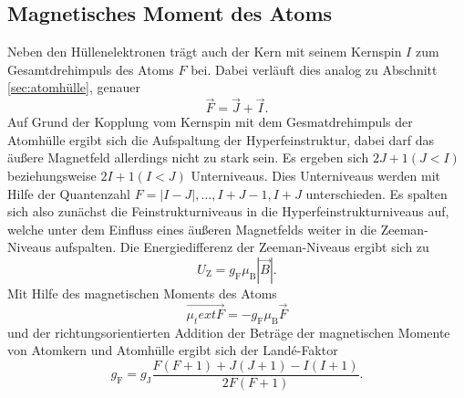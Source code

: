 \subsection{Magnetisches Moment des Atoms}
\label{sec:atom}
Neben den Hüllenelektronen trägt auch der Kern mit seinem Kernspin $I$ zum Gesamtdrehimpuls des Atoms $F$ bei.
Dabei verläuft dies analog zu Abschnitt \ref{sec:atomhülle}, genauer
\begin{equation*}
  \vec{F} = \vec{J} + \vec{I}.
\end{equation*}
Auf Grund der Kopplung vom Kernspin mit dem Gesmatdrehimpuls der Atomhülle ergibt sich die Aufspaltung der 
Hyperfeinstruktur, dabei darf das äußere Magnetfeld allerdings nicht zu stark sein.
Es ergeben sich $2J+1 (J<I)$ beziehungsweise $2I+1 (I<J)$  Unterniveaus. Dies Unterniveaus werden mit Hilfe
der Quantenzahl $F = |I-J|, \ldots,I+J-1, I+J$ unterschieden. Es spalten sich also zunächst die Feinstrukturniveaus
in die Hyperfeinstrukturniveaus auf, welche unter dem Einfluss eines äußeren Magnetfelds weiter in die 
Zeeman-Niveaus aufspalten. Die Energiedifferenz der Zeeman-Niveaus ergibt sich zu
\begin{equation}
  \label{eqn:zeeman}
  U_\text{Z} = g_\text{F} \mu_\text{B} |\vec{B}|.
\end{equation}
Mit Hilfe des magnetischen Moments des Atoms
\begin{equation*}
  \vec{\mu_text{F}} = -g_\text{F} \mu_\text{B} \vec{F}
\end{equation*}
und der richtungsorientierten Addition der Beträge der magnetischen Momente von Atomkern und Atomhülle
ergibt sich der Landé-Faktor
\begin{equation}
  \label{eqn:lande}
  g_\text{F} = g_\text{J} \frac{F(F+1)+J(J+1)-I(I+1)}{2F(F+1)}.
\end{equation}

